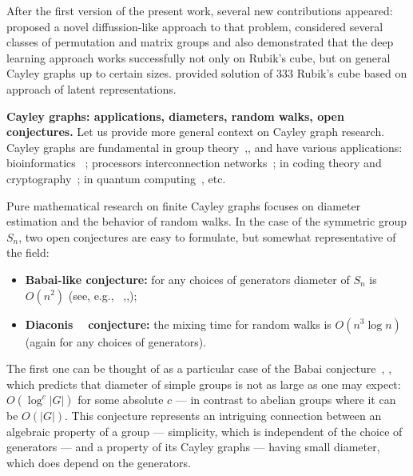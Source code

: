 \documentclass[reqno,11pt]{amsart}
\begin{document}
After the first version of the present work, several new contributions appeared:   \cite{douglas2025diffusion}  proposed a novel diffussion-like approach to that problem, considered several classes of permutation and matrix groups and also demonstrated that the deep learning approach works successfully not only on Rubik's cube, but on general Cayley graphs up to certain sizes.
\cite{ZiarkoBortkiewiczZawalskiEysenbachMilos2025CRTR} provided solution of 333 Rubik's cube based on 
approach of latent representations. 

{\bf Cayley graphs: applications, diameters, random walks, open conjectures.}
Let us provide more general context on Cayley graph research.
Cayley graphs are fundamental in group theory~\cite{gromov1993geometric},\cite{tao2015expansion}, and have various applications: bioinformatics
~\cite{Pevzner1995human2mice, Pevzner1999cabbage2turnip,  bulteau2019parameterized}; processors interconnection networks~\cite{akers1989group, cooperman1991applications,heydemann1997cayley}; in coding theory  and cryptography~\cite{hoory2006expander,zemor1994hash,petit2013rubik}; in quantum computing~\cite{ruiz2024quantum,sarkar2024quantum,dinur2023good, acevedo2006exploring,gromada2022some}, etc.

Pure mathematical research on finite Cayley graphs focuses on diameter estimation and the behavior of random walks. In the case of the symmetric group $S_n$, two open conjectures are easy to formulate, but somewhat representative of the field: 

\begin{itemize}
    \item 
    {\bf Babai-like conjecture:} for any choices of generators diameter of  $S_n$ is $O(n^{2})$ (see, e.g., ~\cite{helfgott2014diameter},\cite{helfgott2019growth},\cite{helfgott2015random}); 

    \item 
    {\bf Diaconis ~\cite{diaconis2013some} conjecture:}  the mixing time for random walks is $O(n^{3}\log n)$ (again for any choices of generators).
\end{itemize}




The first one can be thought of as a particular case of the Babai conjecture~\cite{babai1992diameter}, \cite{tao2015expansion}, which predicts that diameter of simple groups is not as large as one may expect: $O(\log^c|G|)$ for some absolute $c$ --- in contrast to abelian groups where it can be $O(|G|)$. This conjecture represents an intriguing connection between an algebraic property of a group — simplicity, which is independent of the choice of generators — and a property of its Cayley graphs — having small diameter, which does depend on the generators.
\end{document}
